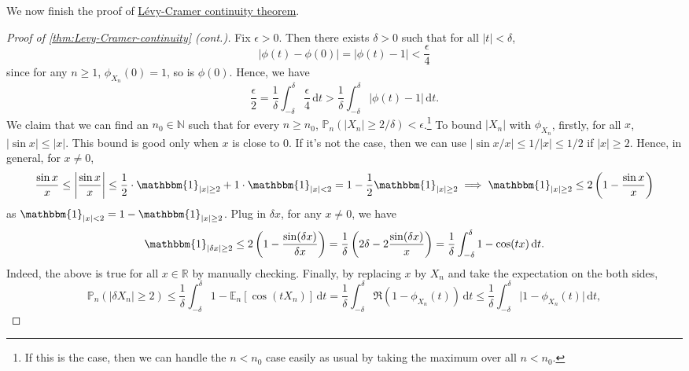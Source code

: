 We now finish the proof of \hyperref[thm:Levy-Cramer-continuity]{Lévy-Cramer continuity theorem}.

\begin{proof}[Proof of \autoref{thm:Levy-Cramer-continuity} (cont.)]\label{pf:thm:Levy-Cramer-continuity}
	Fix \(\epsilon > 0\). Then there exists \(\delta > 0\) such that for all \(\vert t \vert < \delta \),
	\[
		\vert \phi (t) - \phi (0) \vert
		= \vert \phi (t) - 1 \vert
		< \frac{\epsilon }{4}
	\]
	since for any \(n \geq 1\), \(\phi _{X_n}(0) = 1\), so is \(\phi (0)\). Hence, we have
	\[
		\frac{\epsilon }{2}
		= \frac{1}{\delta } \int_{-\delta }^{\delta } \frac{\epsilon }{4} \,\mathrm{d}t
		> \frac{1}{\delta } \int_{-\delta }^{\delta } \vert \phi (t) - 1 \vert \,\mathrm{d}t .
	\]
	We claim that we can find an \(n_0 \in \mathbb{N} \) such that for every \(n \geq n_0\), \(\mathbb{P} _{n}(\vert X_n \vert \geq 2 / \delta ) < \epsilon \).\footnote{If this is the case, then we can handle the \(n < n_0\) case easily as usual by taking the maximum over all \(n < n_0\).} To bound \(\vert X_n \vert \) with \(\phi _{X_n}\), firstly, for all \(x\), \(\vert \sin x \vert \leq \vert x \vert \). This bound is good only when \(x\) is close to \(0\). If it's not the case, then we can use \(\vert \sin x / x \vert \leq 1 / \vert x \vert \leq 1 / 2\) if \(\vert x \vert \geq 2\). Hence, in general, for \(x \neq 0\),
	\[
		\frac{\sin x}{x}
		\leq \left\vert \frac{\sin x}{x} \right\vert
		\leq \frac{1}{2} \cdot \mathbbm{1}_{\vert x \vert \geq 2} + 1 \cdot \mathbbm{1}_{\vert x \vert < 2}
		= 1 - \frac{1}{2} \mathbbm{1}_{\vert x \vert \geq 2}
		\implies \mathbbm{1}_{\vert x \vert \geq 2}
		\leq 2 \left( 1 - \frac{\sin x}{x} \right)
	\]
	as \(\mathbbm{1}_{\vert x \vert < 2} = 1 - \mathbbm{1}_{\vert x \vert \geq 2} \). Plug in \(\delta x\), for any \(x \neq 0\), we have
	\[
		\mathbbm{1}_{\vert \delta x \vert \geq 2}
		\leq 2 \left( 1 - \frac{\sin (\delta x)}{\delta x} \right)
		= \frac{1}{\delta } \left( 2\delta - 2 \frac{\sin (\delta x)}{x} \right)
		= \frac{1}{\delta } \int_{-\delta }^{\delta } 1 - \cos (tx) \,\mathrm{d}t .
	\]
	Indeed, the above is true for all \(x \in \mathbb{R} \) by manually checking. Finally, by replacing \(x\) by \(X_n\) and take the expectation on the both sides,
	\[
		\mathbb{P} _{n}(\vert \delta X_n \vert \geq 2)
		\leq \frac{1}{\delta } \int_{-\delta }^{\delta } 1 - \mathbb{E}_{n}[\cos (t X_n)] \,\mathrm{d}t
		= \frac{1}{\delta } \int_{-\delta }^{\delta } \Re (1 - \phi _{X_n}(t)) \,\mathrm{d}t
		\leq \frac{1}{\delta } \int_{-\delta }^{\delta } \vert 1 - \phi _{X_n}(t) \vert  \,\mathrm{d}t,
\]
\end{proof}
